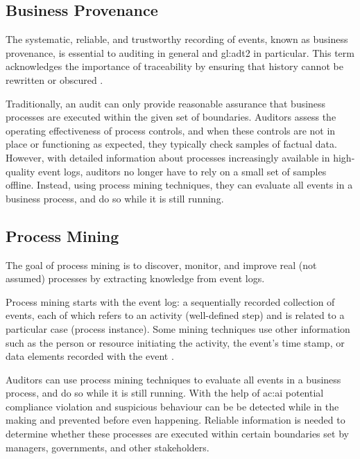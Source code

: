 \subsection{Business Provenance}

The systematic, reliable, and trustworthy recording of events, known as business provenance, is essential to auditing in general and \gls{gl:adt2} in particular. This term acknowledges the importance of traceability by ensuring that history cannot be rewritten or obscured \citep{5427384}.

Traditionally, an audit can only provide reasonable assurance that business processes are executed within the given set of boundaries. Auditors assess the operating effectiveness of process controls, and when these controls are not in place or functioning as expected, they typically check samples of factual data. However, with detailed information about processes increasingly available in high-quality event logs, auditors no longer have to rely on a small set of samples offline. Instead, using process mining techniques, they can evaluate all events in a business process, and do so while it is still running.



\subsection{Process Mining}\label{sec:psmin}

The goal of process mining is to discover, monitor, and improve real (not assumed) processes by extracting knowledge from event logs. 

Process mining starts with the event log: a sequentially recorded collection of events, each of which refers to an activity (well-defined step) and is related to a particular case (process instance). Some mining techniques use other information such as the person or resource initiating the activity, the event's time stamp, or data elements recorded with the event \citep{5427384}.

Auditors can use process mining techniques to evaluate all events in a business process, and do so while it is still running. With the help of \gls{ac:ai} potential compliance violation and suspicious behaviour can be be detected while in the making and prevented before even happening. Reliable information is needed to determine whether these processes are executed within certain boundaries set by managers, governments, and other stakeholders. 

